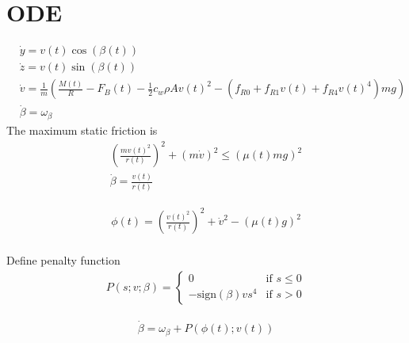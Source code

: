 \documentclass[
10pt, %
a4paper, %
oneside, %
headinclude,footinclude, %
BCOR5mm, %
]{scrartcl}
\begin{document}
\section{ODE}
\begin{align*}
 &\dot{y} = v(t) \cos(\beta(t))\\
& \dot{z} = v(t) \sin(\beta(t)) \\
& \dot{v} = \frac{1}{m}\left( \frac{M(t)}{R} - F_B(t) - \frac{1}{2}  c_w  \rho  A v(t)^2 - \left(f_{R0} + f_{R1} v(t) + f_{R4}v(t)^4 \right) m g\right)\\
& \dot{\beta} = \omega_{\beta} 
\end{align*}
The maximum static friction is
\begin{align*}
\left(\frac{mv(t)^2}{r(t)}\right)^2+ \left(m \dot{v}\right)^2 \leq \left(\mu(t) m g\right)^2\\
\dot{\beta}= \frac{v(t)}{r(t)}
\end{align*}

\begin{align*}
\phi(t) = \left(\frac{v(t)^2}{r(t)}\right)^2+ \dot{v}^2 - \left(\mu(t) g\right)^2\\
\end{align*}

Define penalty function
\begin{align*}
P(s; v; \beta) = \begin{cases} 0 & \text{if }  s \leq 0 \\
-\text{sign}(\beta) v s^4 & \text{if }  s  > 0
\end{cases}
\end{align*}

\begin{align*}
\dot{\beta} = \omega_{\beta} +  P(\phi(t); v(t))
\end{align*}

\renewcommand{\refname}{\spacedlowsmallcaps{References}} %




\end{document}
